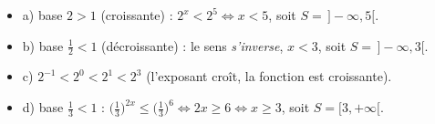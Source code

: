 \documentclass[11pt,a4paper]{article}
\begin{document}
\begin{corrige}
\begin{itemize}[leftmargin=1.4em,topsep=1pt,itemsep=1pt]
  \item a) base $2>1$ (croissante) : $2^{x}<2^{5}\Leftrightarrow x<5$, soit $S=\,]-\infty,5[$.
  \item b) base $\tfrac12<1$ (décroissante) : le sens \emph{s'inverse}, $x<3$, soit $S=\,]-\infty,3[$.
  \item c) $2^{-1}<2^{0}<2^{1}<2^{3}$ (l'exposant croît, la fonction est croissante).
  \item d) base $\tfrac13<1$ : $\bigl(\tfrac13\bigr)^{2x}\leq\bigl(\tfrac13\bigr)^{6}\Leftrightarrow 2x\geq 6\Leftrightarrow x\geq 3$, soit $S=[3,+\infty[$.
\end{itemize}
\end{corrige}
\end{document}
